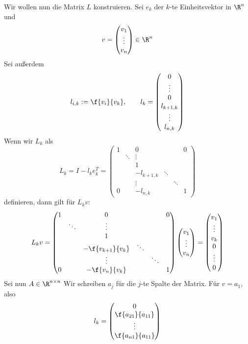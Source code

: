 \documentclass[a4paper]{scrartcl}
\numberwithin{equation}{section}
\begin{document}
Wir wollen nun die Matrix $L$ konstruieren.
Sei $e_k$ der $k$-te Einheitsvektor in $\R^n$ und
\[
v=\begin{pmatrix}v_1\\\vdots\\ v_n\end{pmatrix}\in \R^n
\]
Sei außerdem
\[
	l_{i,k} := \f{v_{i}}{v_{k}}, 
	\qquad l_k = \begin{pmatrix}0 \\ \vdots \\ 0 \\ l_{k+1,k} \\ \vdots \\ l_{n,k}\end{pmatrix}
\]
Wenn wir $L_k$ als
\begin{equation}
\label{eq:3.4}
L_k = I-l_ke_k^T 
= \begin{pmatrix}
	1 &  & 0 &  &  & 0\\
	 & \ddots & \vdots &  &   & \\
	 & & 1 &  &  & \\
					& & -l_{k+1,k} & \ddots & & \\
		   & & \vdots & & \ddots & \\
	  0 &  & -l_{n,k} & & & 1
\end{pmatrix}
\end{equation}
definieren, dann gilt für $L_kv$:
\[
L_kv
= \begin{pmatrix}
	1 &  & 0 &  &  & 0\\
	 & \ddots & \vdots &  &   & \\
	 & & 1 &  &  & \\
		& & -\f{v_{k+1}}{v_k} & \ddots & & \\
		   & & \vdots & & \ddots & \\
	  0 &  & -\f{v_n}{v_k} & & & 1
\end{pmatrix}
\begin{pmatrix}
v_1\\ \vdots \\ v_n
\end{pmatrix}
=\begin{pmatrix}
v_1 \\\vdots \\ v_k\\ 0\\\vdots \\ 0
\end{pmatrix}
\]
Sei nun $A\in\R^{n\times n}$
Wir schreiben $a_j$ für die $j$-te Spalte der Matrix.
Für $v=a_1$, also
\[
	l_k = \begin{pmatrix} 0 \\ \f {a_{21}}{a_{11}} \\ \vdots \\ \f{a_{n1}}{a_{11}}\end{pmatrix}
\]
\end{document}

